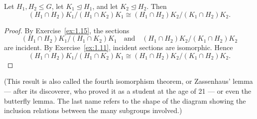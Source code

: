 \documentclass[../Odyssey_Project.tex]{subfiles}
\begin{document}
\begin{namedtheorem}
\label{thm:third-iso}
Let $H_1, H_2 \leq G$, let $K_1 \trianglelefteq H_1$, and let $K_2 \trianglelefteq H_2$. Then
\[(H_1 \cap H_2)K_1/(H_1 \cap K_2)K_1 \cong (H_1 \cap H_2)K_2/(K_1 \cap H_2)K_2.\]
\end{namedtheorem}
\begin{proof}
By Exercise~\ref{ex:1.15}, the sections
\[
    (H_1 \cap H_2)K_1/(H_1 \cap K_2)K_1
    \quad\text{and}\quad
    (H_1 \cap H_2)K_2/(K_1 \cap H_2)K_2
\]
are incident. By Exercise~\ref{ex:1.11}, incident sections are isomorphic. Hence
\[
    (H_1 \cap H_2)K_1/(H_1 \cap K_2)K_1
    \cong
    (H_1 \cap H_2)K_2/(K_1 \cap H_2)K_2.
\]
\end{proof}
\smallskip
\noindent (This result is also called the fourth isomorphism theorem, or Zassenhaus' lemma --- after its discoverer, who proved it as a student at the age of 21 --- or even the butterfly lemma. The last name refers to the shape of the diagram showing the inclusion relations between the many subgroups involved.)
\end{document}
